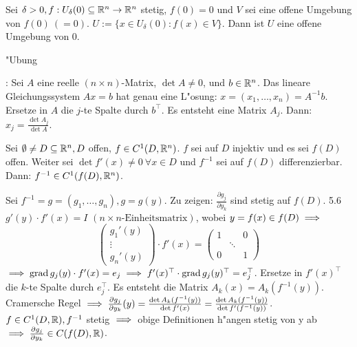 \documentclass[a4paper,twoside,DIV15,BCOR12mm,chapterprefix=true,headings=twolinechapter]{scrbook}
\begin{document}
\begin{wichtigerhilfssatz}
Sei $\delta>0, f:U_\delta(0)\subseteq\mathbb{R}^n\to\mathbb{R}^n$ stetig, $f(0)=0$ und $V$ sei eine offene Umgebung von $f(0)\ (=0)$. $U:=\{x\in U_\delta(0):f(x)\in V\}$. Dann ist $U$ eine offene Umgebung von $0$.
\end{wichtigerhilfssatz}
\begin{beweis}
"Ubung
\end{beweis}

\begin{erinnerung}
: Sei $A$ eine reelle $(n\times n)$-Matrix, $\det A\ne 0$, und $b\in\mathbb{R}^n$. Das lineare Gleichungssystem $Ax=b$ hat genau eine L"osung: $x=(x_1,\ldots,x_n)=A^{-1}b$. Ersetze in $A$ die $j$-te Spalte durch $b^\top$. Es entsteht eine Matrix $A_j$. Dann: $x_j=\frac{\det A_j}{\det A}$.
\end{erinnerung}

\begin{satz}
Sei $\emptyset\ne D\subseteq \mathbb{R}^n, D$ offen, $f\in C^1(D,\mathbb{R}^n)$. $f$ sei auf $D$ injektiv und es sei $f(D)$ offen. Weiter sei $\det f'(x)\ne 0\ \forall x\in D$ und $f^{-1}$ sei auf $f(D)$ differenzierbar. Dann: $f^{-1}\in C^1(f(D),\mathbb{R}^n)$.
\end{satz}

\begin{beweis}
Sei $f^{-1}=g=(g_1,\ldots,g_n), g=g(y)$. Zu zeigen: $\frac{\partial g_j}{\partial y_k}$ sind stetig auf $f(D)$. 5.6\folgt $g'(y)\cdot f'(x)=I$ $(n\times n\text{-Einheitsmatrix})$, wobei $y=f(x)\in f(D)\implies$
$$
\begin{pmatrix}
g_1'(y)\\
\vdots\\
g_n'(y)
\end{pmatrix}\cdot f'(x)=
\begin{pmatrix}
1 & & 0 \\
& \ddots &\\
0 & & 1
\end{pmatrix}$$
$\implies \mathop{\rm grad}\nolimits g_j(y)\cdot f'(x)=e_j\implies f'(x)^\top\cdot \mathop{\rm grad}\nolimits g_j(y)^\top=e_j^\top$. Ersetze in $f'(x)^\top$ die $k$-te Spalte durch $e_j^\top$. Es entsteht die Matrix $A_k(x)=A_k(f^{-1}(y))$. Cramersche Regel $\implies \frac{\partial g_j}{\partial y_k}(y)=\frac{\det A_k(f^{-1}(y))}{\det f'(x)}=\frac{\det A_k(f^{-1}(y))}{\det f'(f^{-1}(y))}$. $f\in C^1(D,\mathbb{R}), f^{-1}$ stetig $\implies$ obige Definitionen h"angen stetig von y ab $\implies \frac{\partial g_j}{\partial y_k}\in C(f(D),\mathbb{R})$.
\end{beweis}
\end{document}
